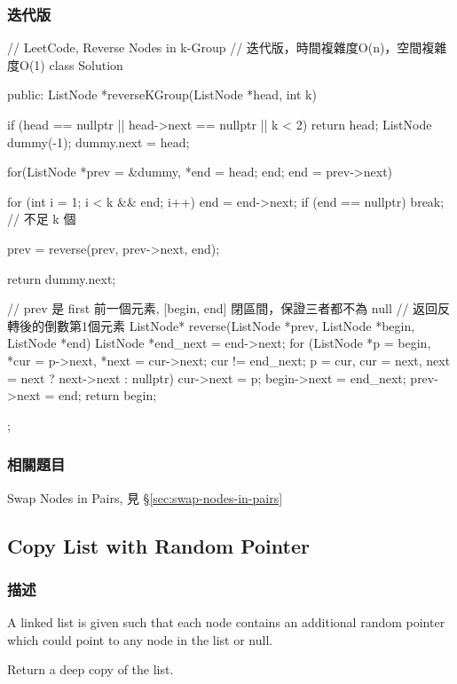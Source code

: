 \subsubsection{迭代版}
\begin{Code}
// LeetCode, Reverse Nodes in k-Group
// 迭代版，時間複雜度O(n)，空間複雜度O(1)
class Solution {
public:
    ListNode *reverseKGroup(ListNode *head, int k) {
        if (head == nullptr || head->next == nullptr || k < 2) return head;
        ListNode dummy(-1);
        dummy.next = head;

        for(ListNode *prev = &dummy, *end = head; end; end = prev->next) {
            for (int i = 1; i < k && end; i++)
                end = end->next;
            if (end  == nullptr) break;  // 不足 k 個

            prev = reverse(prev, prev->next, end);
        }

        return dummy.next;
    }

    // prev 是 first 前一個元素, [begin, end] 閉區間，保證三者都不為 null
    // 返回反轉後的倒數第1個元素
    ListNode* reverse(ListNode *prev, ListNode *begin, ListNode *end) {
        ListNode *end_next = end->next;
        for (ListNode *p = begin, *cur = p->next, *next = cur->next;
                cur != end_next;
                p = cur, cur = next, next = next ? next->next : nullptr) {
            cur->next = p;
        }
        begin->next = end_next;
        prev->next = end;
        return begin;
    }
};
\end{Code}


\subsubsection{相關題目}
\begindot
\item Swap Nodes in Pairs, 見 \S \ref{sec:swap-nodes-in-pairs}
\myenddot


\subsection{Copy List with Random Pointer}
\label{sec:copy-list-with-random-pointer}


\subsubsection{描述}
A linked list is given such that each node contains an additional random pointer which could point to any node in the list or null.

Return a deep copy of the list.


